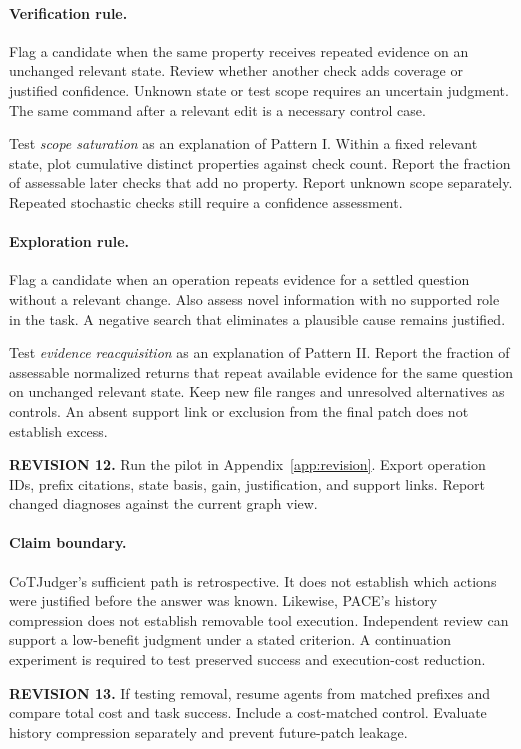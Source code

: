 \documentclass[10pt,a4paper,twocolumn]{article}
\newcommand{\rev}[2]{\par\smallskip\noindent\begin{minipage}{\linewidth}\color{revision}\footnotesize\textbf{REVISION #1.} #2\end{minipage}\par\smallskip}
\begin{document}
\paragraph{Verification rule.}
Flag a candidate when the same property receives repeated evidence on an unchanged relevant state. Review whether another check adds coverage or justified confidence. Unknown state or test scope requires an uncertain judgment. The same command after a relevant edit is a necessary control case.

Test \emph{scope saturation} as an explanation of Pattern I. Within a fixed relevant state, plot cumulative distinct properties against check count. Report the fraction of assessable later checks that add no property. Report unknown scope separately. Repeated stochastic checks still require a confidence assessment.

\paragraph{Exploration rule.}
Flag a candidate when an operation repeats evidence for a settled question without a relevant change. Also assess novel information with no supported role in the task. A negative search that eliminates a plausible cause remains justified.

Test \emph{evidence reacquisition} as an explanation of Pattern II. Report the fraction of assessable normalized returns that repeat available evidence for the same question on unchanged relevant state. Keep new file ranges and unresolved alternatives as controls. An absent support link or exclusion from the final patch does not establish excess.
\rev{12}{Run the pilot in Appendix~\ref{app:revision}. Export operation IDs, prefix citations, state basis, gain, justification, and support links. Report changed diagnoses against the current graph view.}

\paragraph{Claim boundary.}
CoTJudger's sufficient path is retrospective. It does not establish which actions were justified before the answer was known. Likewise, PACE's history compression does not establish removable tool execution. Independent review can support a low-benefit judgment under a stated criterion. A continuation experiment is required to test preserved success and execution-cost reduction.
\rev{13}{If testing removal, resume agents from matched prefixes and compare total cost and task success. Include a cost-matched control. Evaluate history compression separately and prevent future-patch leakage.}
\end{document}
